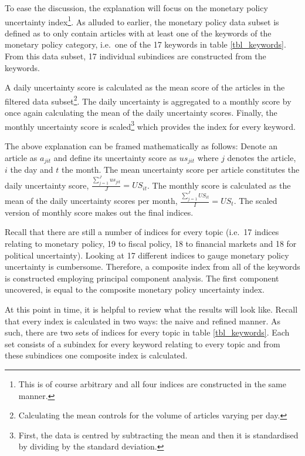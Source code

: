 \documentclass[11pt,preprint, authoryear]{elsarticle}
\numberwithin{equation}{section}
\numberwithin{figure}{section}
\numberwithin{table}{section}
\let\rmarkdownfootnote\footnote%
\def\footnote{\protect\rmarkdownfootnote}
\begin{document}
To ease the discussion, the explanation will focus on the monetary
policy uncertainty index\footnote{This is of course arbitrary and all
  four indices are constructed in the same manner.}. As alluded to
earlier, the monetary policy data subset is defined as to only contain articles with at least one of the keywords of the monetary policy
category, i.e.~one of the 17 keywords in table \ref{tbl_keywords}. From
this data subset, 17 individual subindices are constructed from the keywords. %

A daily uncertainty score is calculated as the mean score of the
articles in the filtered data subset\footnote{Calculating the mean
  controls for the volume of articles varying per day.}. The daily
uncertainty is aggregated to a monthly score by once again calculating
the mean of the daily uncertainty scores. Finally, the monthly
uncertainty score is scaled\footnote{First, the data is centred by subtracting the mean and then it is standardised by dividing by the standard deviation.} which provides the index for every keyword.

The above explanation can be framed mathematically as follows: Denote an
article as \(a_{jit}\) and define its uncertainty score as \(us_{jit}\)
where \(j\) denotes the article, \(i\) the day and \(t\) the month. The
mean uncertainty score per article constitutes the daily uncertainty
score, \(\frac{\sum_{j=1}^Jus_{jit}}{J}= US_{it}\). The monthly score is
calculated as the mean of the daily uncertainty scores per month,
\(\frac{\sum_{j=1}^JUS_{it}}{I}= US_{t}\). The scaled version of monthly score makes out the final indices.

Recall that there are still a number of indices for every topic (i.e.~17
indices relating to monetary policy, 19 to fiscal policy, 18 to
financial markets and 18 for political uncertainty). Looking at 17
different indices to gauge monetary policy uncertainty is cumbersome.
Therefore, a composite index from all of the keywords is constructed
employing principal component analysis. The first component uncovered,
is equal to the composite monetary policy uncertainty index.

At this point in time, it is helpful to review what the results will
look like. Recall that every index is calculated in two ways: the naive
and refined manner. As such, there are two sets of indices for every
topic in table \ref{tbl_keywords}. Each set consists of a subindex for
every keyword relating to every topic and from these subindices one
composite index is calculated.
\end{document}
